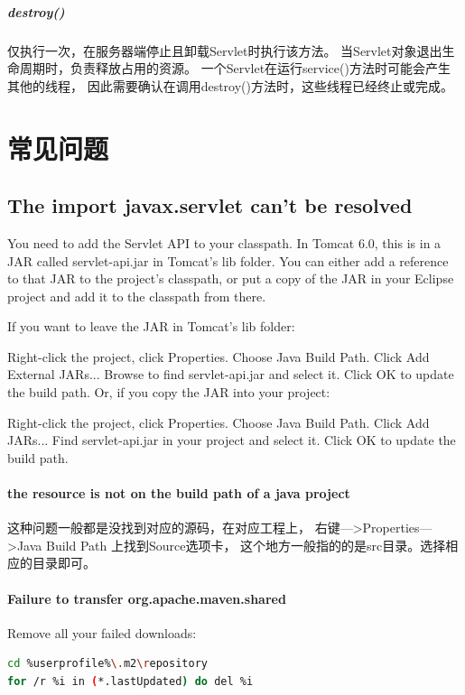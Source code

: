 \documentclass{book}
\begin{document}
\subparagraph{destroy()}仅执行一次，在服务器端停止且卸载Servlet时执行该方法。
当Servlet对象退出生命周期时，负责释放占用的资源。
一个Servlet在运行service()方法时可能会产生其他的线程，
因此需要确认在调用destroy()方法时，这些线程已经终止或完成。

\section{常见问题}

\subsection{The import javax.servlet can't be resolved}

You need to add the Servlet API to your classpath. 
In Tomcat 6.0, this is in a JAR called servlet-api.jar in Tomcat's lib folder. 
You can either add a reference to that JAR to the project's classpath, 
or put a copy of the JAR in your Eclipse project and add it to the classpath from there.

If you want to leave the JAR in Tomcat's lib folder:

Right-click the project, click Properties.
Choose Java Build Path.
Click Add External JARs...
Browse to find servlet-api.jar and select it.
Click OK to update the build path.
Or, if you copy the JAR into your project:

Right-click the project, click Properties.
Choose Java Build Path.
Click Add JARs...
Find servlet-api.jar in your project and select it.
Click OK to update the build path.

\paragraph{the resource is not on the build path of a java project}

这种问题一般都是没找到对应的源码，在对应工程上，
右键--->Properties--->Java Build Path 上找到Source选项卡，
这个地方一般指的的是src目录。选择相应的目录即可。

\paragraph{Failure to transfer org.apache.maven.shared}

Remove all your failed downloads:

\begin{lstlisting}[language=Bash]
cd %userprofile%\.m2\repository
for /r %i in (*.lastUpdated) do del %i
\end{lstlisting}
\end{document}
